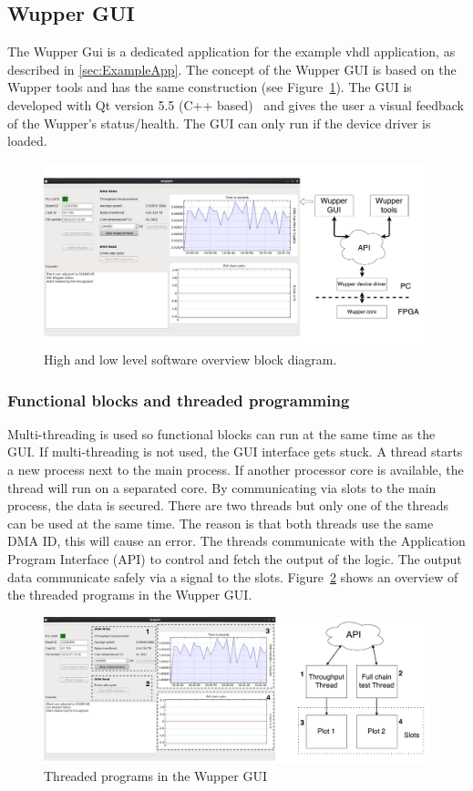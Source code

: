 \newpage


\subsection {Wupper GUI}

The Wupper Gui is a dedicated application for the example vhdl application, as described in \ref{sec:ExampleApp}. The concept of the Wupper GUI is based on the Wupper tools and has the same construction (see Figure~\ref{fig:softwaretree}). The GUI is developed with Qt version 5.5 (C++ based)~\cite{qt} and gives the user a visual feedback of the Wupper's status/health. The GUI can only run if the device driver is loaded.

\begin{figure}[h]
	\centering
	\includegraphics[width = 0.7 \textwidth]{figures/tree.pdf}	
	\caption{High and low level software overview block diagram.}
	\label{fig:softwaretree}
\end{figure}

\subsubsection {Functional blocks and threaded programming}


Multi-threading is used so functional blocks can run at the same time as the GUI. If multi-threading is not used, the GUI interface gets stuck. A thread starts a new process next to the main process. If another processor core is available, the thread will run on a separated core. By communicating via slots to the main process, the data is secured.
There are two threads but only one of the threads can be used at the same time. The reason is that both threads use the same DMA ID, this will cause an error.
The threads communicate with the Application Program Interface (API) to control and fetch the output of the logic. The output data communicate safely via a signal to the slots. Figure~\ref{fig:guithreads} shows an overview of the threaded programs in the Wupper GUI.

\begin{figure}[h]
	\centering
	\includegraphics[width = 0.9 \textwidth]{figures/wupper_gui_threads_overview.pdf}	
	\caption{Threaded programs in the Wupper GUI}
	\label{fig:guithreads}
\end{figure}

